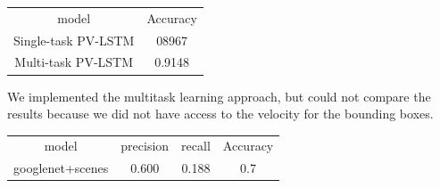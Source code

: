 \documentclass[11pt]{article}
\begin{document}
\begin{center}
\begin{tabular}{| c c |}\hline
    model & Accuracy\\

    Single-task PV-LSTM & 08967\\
    Multi-task PV-LSTM & 0.9148\\\hline

\end{tabular}
\end{center}
We implemented the multitask learning approach, but could not compare the results because we did not have access to the
velocity for the bounding boxes.

\begin{center}
\begin{tabular}{| c c c c |}\hline
    model & precision & recall & Accuracy\\
    googlenet+scenes &  0.600  &  0.188 &  0.7 \\


\end{tabular}
\end{center}




\end{document}
